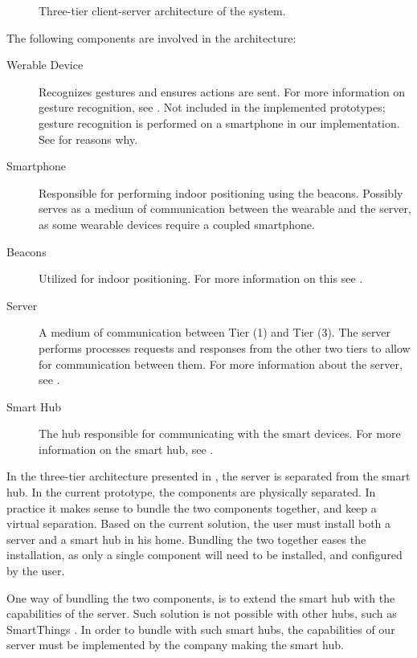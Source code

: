 \begin{figure}[H]
  \centering
  
  \caption{Three-tier client-server architecture of the system.}
  \label{fig:architecture}
\end{figure}

The following components are involved in the architecture:
\begin{description}
    \item[Werable Device] Recognizes gestures and ensures actions are sent. For more information on gesture recognition, see . Not included in the implemented prototypes; gesture recognition is performed on a smartphone in our implementation. See  for reasons why. 
    \item[Smartphone] Responsible for performing indoor positioning using the beacons. Possibly serves as a medium of communication between the wearable and the server, as some wearable devices require a coupled smartphone.
    \item[Beacons] Utilized for indoor positioning. For more information on this see .
    \item[Server] A medium of communication between Tier (1) and Tier (3). The server performs processes requests and responses from the other two tiers to allow for communication between them. For more information about the server, see .
    \item[Smart Hub] The hub responsible for communicating with the smart devices. For more information on the smart hub, see .
\end{description}

In the three-tier architecture presented in , 
the server is separated from the smart hub. 
In the current prototype, 
the components are physically separated. 
In practice it makes sense to bundle the two components together, 
and keep a virtual separation. 
Based on the current solution, 
the user must install both a server and a smart hub in his home. 
Bundling the two together eases the installation, 
as only a single component will need to be installed, 
and configured by the user.

One way of bundling the two components, 
is to extend the smart hub with the capabilities of the server.
Such solution is not possible with other hubs, such as SmartThings \cite{SMARTTHINGS}.
In order to bundle with such smart hubs, 
the capabilities of our server must be implemented by the company making the smart hub. 



